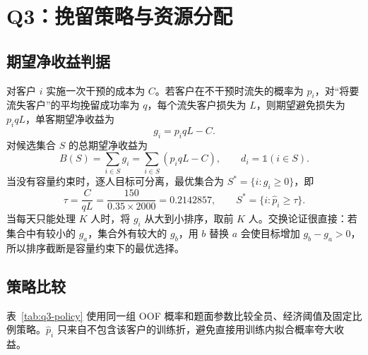 \documentclass[UTF8,a4paper,11pt]{ctexart}
\begin{document}
\section{Q3：挽留策略与资源分配}\label{sec:q3}

\subsection{期望净收益判据}
对客户 \(i\) 实施一次干预的成本为 \(C\)。若客户在不干预时流失的概率为 \(p_i\)，对“将要流失客户”的平均挽留成功率为 \(q\)，每个流失客户损失为 \(L\)，则期望避免损失为 \(p_iqL\)，单客期望净收益为
\begin{equation}
g_i=p_iqL-C.
\label{eq:q3-person-net}
\end{equation}
对候选集合 \(S\) 的总期望净收益为
\begin{equation}
B(S)=\sum_{i\in S}g_i
 =\sum_{i\in S}(p_iqL-C),
\qquad d_i=\mathbb{1}(i\in S).
\label{eq:q3-objective}
\end{equation}
当没有容量约束时，逐人目标可分离，最优集合为 \(S^*=\{i:g_i\geq0\}\)，即
\begin{equation}
\tau=\frac{C}{qL}=\frac{150}{0.35\times2000}=0.2142857,
\qquad S^*=\{i:\widehat p_i\geq\tau\}.
\label{eq:q3-threshold}
\end{equation}
当每天只能处理 \(K\) 人时，将 \(g_i\) 从大到小排序，取前 \(K\) 人。交换论证很直接：若集合中有较小的 \(g_a\)，集合外有较大的 \(g_b\)，用 \(b\) 替换 \(a\) 会使目标增加 \(g_b-g_a>0\)，所以排序截断是容量约束下的最优选择。

\subsection{策略比较}
表~\ref{tab:q3-policy} 使用同一组 OOF 概率和题面参数比较全员、经济阈值及固定比例策略。\(\widehat p_i\) 只来自不包含该客户的训练折，避免直接用训练内拟合概率夸大收益。
\end{document}
